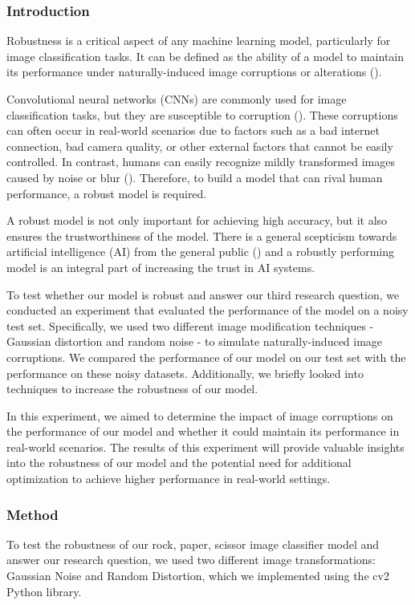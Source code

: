 \documentclass[a4paper]{article}
\begin{document}
\subsubsection{Introduction}
Robustness is a critical aspect of any machine learning model, particularly for image classification tasks. It can be defined as the ability of a model to maintain its performance under naturally-induced image corruptions or alterations (\cite{robustness}).

Convolutional neural networks (CNNs) are commonly used for image classification tasks, but they are susceptible to corruption (\cite{corruption}). These corruptions can often occur in real-world scenarios due to factors such as a bad internet connection, bad camera quality, or other external factors that cannot be easily controlled. In contrast, humans can easily recognize mildly transformed images caused by noise or blur (\cite{corruption}). Therefore, to build a model that can rival human performance, a robust model is required.

A robust model is not only important for achieving high accuracy, but it also ensures the trustworthiness of the model. There is a general scepticism towards artificial intelligence (AI) from the general public (\cite{AITrust}) and a robustly performing model is an integral part of increasing the trust in AI systems.

To test whether our model is robust and answer our third research question, we conducted an experiment that evaluated the performance of the model on a noisy test set. Specifically, we used two different image modification techniques - Gaussian distortion and random noise - to simulate naturally-induced image corruptions. We compared the performance of our model on our test set with the performance on these noisy datasets. Additionally, we briefly looked into techniques to increase the robustness of our model.

In this experiment, we aimed to determine the impact of image corruptions on the performance of our model and whether it could maintain its performance in real-world scenarios. The results of this experiment will provide valuable insights into the robustness of our model and the potential need for additional optimization to achieve higher performance in real-world settings.

\subsubsection{Method}
To test the robustness of our rock, paper, scissor image classifier model and answer our research question, we used two different image transformations: Gaussian Noise and Random Distortion, which we implemented using the cv2 Python library.
\end{document}
